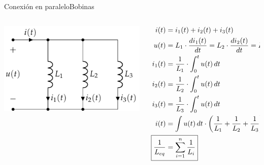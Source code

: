 \documentclass[aspectratio=169, xcolor={usenames,svgnames,dvipsnames}]{beamer}
\begin{document}
\begin{frame}{Conexión en paralelo}{Bobinas}
\begin{columns}
\begin{column}{0.4\columnwidth}
\begin{center}
\includegraphics[width=.9\linewidth]{../figs/BobinasParalelo.pdf}
\end{center}
\end{column}
\begin{column}{0.6\columnwidth}
\begin{align*}
  i(t)& = i_1(t) + i_2(t) + i_3(t)\\
  u(t) &= L_1 \cdot \frac{di_1(t)}{dt}= L_2 \cdot \frac{di_2(t)}{dt}= L_3 \cdot \frac{di_3(t)}{dt}\\
  i_1(t)&=\dfrac{1}{L_1}\cdot\int_{0}^{t} u(t)\, dt\\
  i_2(t)&=\dfrac{1}{L_2}\cdot\int_{0}^{t} u(t)\, dt\\
  i_3(t)&=\dfrac{1}{L_3}\cdot\int_{0}^{t} u(t)\, dt\\
  i(t)& = \int u(t)\,dt \cdot \left(\dfrac{1}{L_1}+\dfrac{1}{L_2}+\dfrac{1}{L_3}\right)\\
  \Aboxed{\frac{1}{L_{eq}} &= \sum_{i = 1}^n \frac{1}{L_i}}
\end{align*}
\end{column}
\end{columns}
\end{frame}
\end{document}
